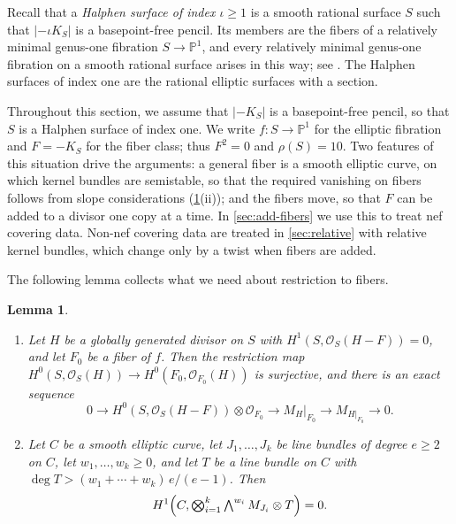 \documentclass[11pt,reqno]{amsart}
\numberwithin{equation}{section}
\newtheorem{lemma}[lemma]{Lemma}
\theoremstyle{remark}
\newcommand{\sshf}[1]{\mathcal{O}_{#1}}
\newcommand{\prj}[1]{\mathbb{P}^{#1}}
\begin{document}
Recall that a \emph{Halphen surface of index \(\iota\geq1\)} is a smooth rational surface \(S\) such that \(|-\iota K_S|\) is a basepoint-free pencil. Its members are the fibers of a relatively minimal genus-one fibration \(S\to\prj{1}\), and every relatively minimal genus-one fibration on a smooth rational surface arises in this way; see \cite[Section~2.2]{CantatDolgachev}. The Halphen surfaces of index one are the rational elliptic surfaces with a section.

Throughout this section, we assume that \(|-K_S|\) is a basepoint-free pencil, so that \(S\) is a Halphen surface of index one. We write \(f\colon S\to\prj{1}\) for the elliptic fibration and \(F=-K_S\) for the fiber class; thus \(F^2=0\) and \(\rho(S)=10\). Two features of this situation drive the arguments: a general fiber is a smooth elliptic curve, on which kernel bundles are semistable, so that the required vanishing on fibers follows from slope considerations (\cref{lem:fiber-restriction}\textup{(ii)}); and the fibers move, so that \(F\) can be added to a divisor one copy at a time. In \cref{sec:add-fibers} we use this to treat nef covering data. Non-nef covering data are treated in \cref{sec:relative} with relative kernel bundles, which change only by a twist when fibers are added.

The following lemma collects what we need about restriction to fibers.

\begin{lemma}\label{lem:fiber-restriction}    
\begin{enumerate} 
\item Let \(H\) be a globally generated divisor on \(S\) with \(H^1(S,\sshf{S}(H-F))=0\), and let \(F_0\) be a fiber of \(f\). Then the restriction map \(H^0(S,\sshf{S}(H))\to H^0(F_0,\sshf{F_0}(H))\) is surjective, and there is an exact sequence
\begin{equation}\label{eq:complete-restriction-kernel}
 0\longrightarrow H^0(S,\sshf{S}(H-F))\otimes\sshf{F_0}
 \longrightarrow M_H|_{F_0}\longrightarrow M_{H|_{F_0}}\longrightarrow0.
\end{equation}
\item Let \(C\) be a smooth elliptic curve, let \(J_1,\dots,J_k\) be line bundles of degree \(e\geq2\) on \(C\), let \(w_1,\dots,w_k\geq0\), and let \(T\) be a line bundle on \(C\) with \(\deg T>(w_1+\cdots+w_k)\,e/(e-1)\). Then
\[
 H^1\Bigl(C,\textstyle\bigotimes_{i=1}^k\bigwedge^{w_i}M_{J_i}\otimes T\Bigr)=0.
\]
\end{enumerate}
\end{lemma}
\end{document}
